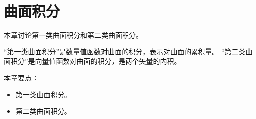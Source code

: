 \chapter{曲面积分}

本章讨论第一类曲面积分和第二类曲面积分。

“第一类曲面积分”是数量值函数对曲面的积分，表示对曲面的累积量。
“第二类曲面积分”是向量值函数对曲面的积分，是两个矢量的内积。

本章要点：
\begin{itemize}
    \item 第一类曲面积分。
    \item 第二类曲面积分。
\end{itemize}

~

\newpage


\newpage


\newpage


\newpage


\newpage





